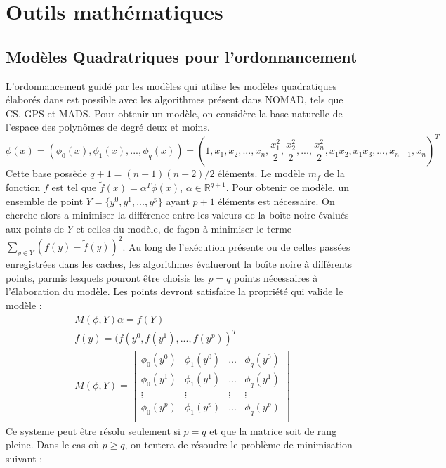 \documentclass[letterpaper]{scrartcl}
\newcommand{\R}{\mathbb{R}}
\begin{document}
\section{Outils mathématiques}
\subsection{Modèles Quadratriques pour l'ordonnancement}
L'ordonnancement guidé par les modèles qui utilise les modèles quadratiques élaborés dans \cite{CoLed2011} est possible avec les algorithmes présent dans NOMAD, tels que CS, GPS et MADS. Pour obtenir un modèle, on considère la base naturelle de l'espace des polynômes de degré deux et moins. 
\begin{equation*}
\phi (x)=(\phi_0(x),\phi_1(x),...,\phi_q(x)) = \left(1,x_1,x_2,...,x_n,\frac{x_1^2}{2},\frac{x_2^2}{2},...,\frac{x_n^2}{2},x_1 x_2, x_1 x_3,...,x_{n-1},x_{n}\right)^T
\end{equation*}
Cette base possède $q+1 = (n+1)(n+2)/2$ éléments. Le modèle $m_f$ de la fonction $f$ est tel que $\tilde{f}(x)=\alpha^T\phi(x)$, $\alpha \in \R^{q+1}$. Pour obtenir ce modèle, un ensemble de point $Y=\{y^0,y^1,...,y^p\}$ ayant $p+1$ éléments est nécessaire. On cherche alors a minimiser la différence entre les valeurs de la boîte noire évalués aux points de $Y$ et celles du modèle, de façon à minimiser le terme $\underset{y\in Y}{\sum}{(f(y)-\tilde{f}(y))^2}$. Au long de l'exécution présente ou de celles passées enregistrées dans les caches, les algorithmes évalueront la boîte noire à différents points, parmis lesquels pouront être choisis les $p = q$ points nécessaires à l'élaboration du modèle. Les points devront satisfaire la propriété qui valide le modèle : 
\begin{gather*}
	M(\phi,Y)\alpha = f(Y)\\
	f(y)=(f(y^0,f(y^1),...,f(y^p))^T\\
	M(\phi,Y) = 
	\begin{bmatrix}
	\phi_0(y^0) & \phi_1(y^0) & \dots & \phi_q(y^0)\\
	\phi_0(y^1) & \phi_1(y^1) & \dots & \phi_q(y^1)\\
	\vdots & \vdots & \vdots & \vdots\\
	\phi_0(y^p) & \phi_1(y^p) & \dots & \phi_q(y^p)\\
	\end{bmatrix}
\end{gather*}
Ce systeme peut être résolu seulement si $p=q$ et que la matrice soit de rang pleine. Dans le cas où $p\geq q$, on tentera de résoudre le problème de minimisation suivant : 
\end{document}
